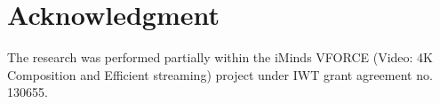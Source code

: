 \documentclass[journal]{IEEEtran}
\begin{document}
%
%

\section*{Acknowledgment}


The research was performed partially within the iMinds VFORCE
(Video: 4K Composition and Efficient streaming)
project under IWT grant agreement no. 130655.



\ifCLASSOPTIONcaptionsoff
  \newpage
\fi





%
%
%
%
%


\end{document}
